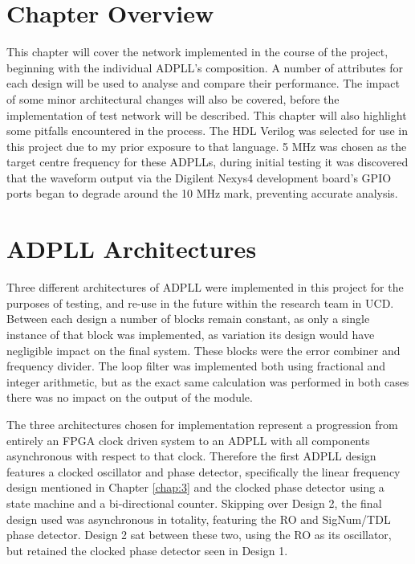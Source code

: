 \section{Chapter Overview}
This chapter will cover the network implemented in the course of the project, beginning with the individual \ac{ADPLL}'s composition. A number of attributes for each design will be used to analyse and compare their performance. The impact of some minor architectural changes will also be covered, before the implementation of test network will be described. This chapter will also highlight some pitfalls encountered in the process. The \ac{HDL} Verilog was selected for use in this project due to my prior exposure to that language. 5 MHz was chosen as the target centre frequency for these \ac{ADPLL}s, during initial testing it was discovered that the waveform output via the Digilent Nexys4 development board's \ac{GPIO} ports began to degrade around the 10 MHz mark, preventing accurate analysis.

\section{\acs{ADPLL} Architectures}
Three different architectures of \ac{ADPLL} were implemented in this project for the purposes of testing, and re-use in the future within the research team in \acl{UCD}. Between each design a number of blocks remain constant, as only a single instance of that block was implemented, as variation its design would have negligible impact on the final system. These blocks were the error combiner and frequency divider. The loop filter was implemented both using fractional and integer arithmetic, but as the exact same calculation was performed in both cases there was no impact on the output of the module.

The three architectures chosen for implementation represent a progression from entirely an \ac{FPGA} clock driven system to an \ac{ADPLL} with all components asynchronous with respect to that clock. Therefore the first \ac{ADPLL} design features a clocked oscillator and phase detector, specifically the linear frequency design mentioned in Chapter \ref{chap:3} and the clocked phase detector using a state machine and a bi-directional counter. Skipping over Design 2, the final design used was asynchronous in totality, featuring the \acl{RO} and SigNum/\ac{TDL} phase detector. Design 2 sat between these two, using the \ac{RO} as its oscillator, but retained the clocked phase detector seen in Design 1.

